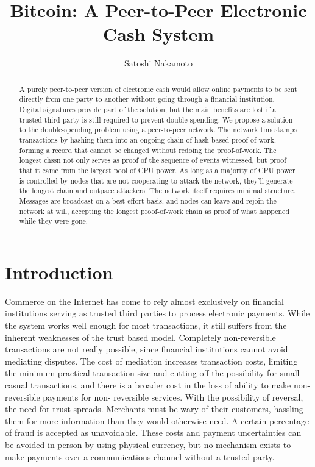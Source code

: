 \documentclass[11pt]{article}
\author{Satoshi Nakamoto}
\date{}
\title{Bitcoin: A Peer-to-Peer Electronic Cash System}
\begin{document}
\maketitle
\begin{abstract}
A purely peer-to-peer version of electronic cash would allow online payments to be sent directly from one party to another without going through a financial institution.
Digital signatures provide part of the solution, but the main benefits are lost if a trusted third party is still required to prevent double-spending.
We propose a solution to the double-spending problem using a peer-to-peer network.
The network timestamps transactions by hashing them into an ongoing chain of hash-based proof-of-work, forming a record that cannot be changed without redoing the proof-of-work.
The longest chssn not only serves as proof of the sequence of events witnessed, but proof that it came from the largest pool of CPU power.
As long as a majority of CPU power is controlled by nodes that are not cooperating to attack the network, they'll generate the longest chain and outpace attackers.
The network itself requires minimal structure.
Messages are broadcast on a best effort basis, and nodes can leave and rejoin the network at will, accepting the longest proof-of-work chain as proof of what happened while they were gone.
\end{abstract}

\section{Introduction}
\label{sec:org59b6e9f}
Commerce on the Internet has come to rely almost exclusively on financial institutions serving as trusted third parties to process electronic payments.
While the system works well enough for most transactions, it still suffers from the inherent weaknesses of the trust based model.
Completely non-reversible transactions are not really possible, since financial institutions cannot avoid mediating disputes.
The cost of mediation increases transaction costs, limiting the minimum practical transaction size and cutting off the possibility for small casual transactions, and there is a broader cost in the loss of ability to make non-reversible payments for non- reversible services.
With the possibility of reversal, the need for trust spreads.
Merchants must be wary of their customers, hassling them for more information than they would otherwise need.
A certain percentage of fraud is accepted as unavoidable.
These costs and payment uncertainties can be avoided in person by using physical currency, but no mechanism exists to make payments over a communications channel without a trusted party.
\end{document}
